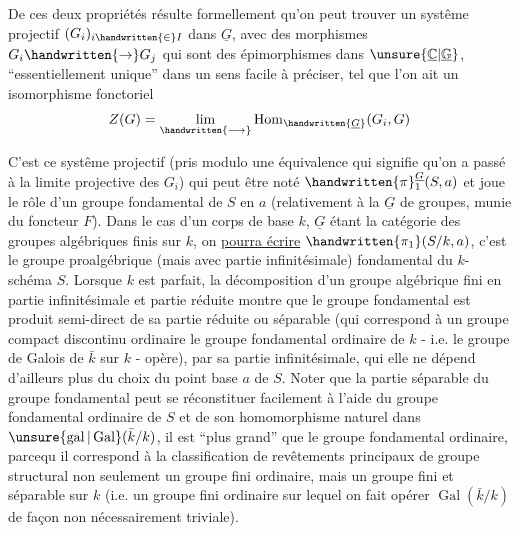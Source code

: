 
De ces deux propriétés résulte formellement qu'on peut trouver un systême projectif  $(G_i)_{i\handwritten{\in}I}$ dans $\underline{G}$, avec des morphismes $G_i\handwritten{\to}G_j$ qui sont des épimorphismes dans $\unsure{\underline{\mathbb{C}}|\underline{\mathbb{G}}}$, ``essentiellement unique'' dans un sens facile à préciser, tel que  l'on ait un isomorphisme fonctoriel
\[
Z(G)=\underset{\handwritten{\longrightarrow}}{\lim}\operatorname{Hom}_{\handwritten{\underline{G}}}(G_i,G)
\]

C'est ce systême projectif (pris modulo une équivalence qui  signifie qu'on a passé à la limite projective des $G_i$) qui peut être noté $\handwritten{\pi}^{\underline{G}}_1(S,a)$ et joue le rôle d'un groupe fondamental de $S$ en $a$ (relativement à la  $\underline{G}$ de groupes, munie du foncteur $F$). Dans le cas  d'un corps de base $k$, $\underline{G}$ étant la catégorie des groupes algébriques finis sur $k$, on \uline{pourra écrire} $\handwritten{\pi_1}(S/k,a)$, c'est le groupe proalgébrique (mais avec partie infinitésimale) fondamental du $k$-schéma $S$. Lorsque $k$ est parfait, la décomposition d'un groupe algébrique fini en partie infinitésimale et partie réduite montre que le groupe fondamental est produit semi-direct de sa partie réduite ou séparable  (qui correspond à un groupe compact discontinu ordinaire\handwritten{,}  le groupe fondamental ordinaire de $k$ - i.e. le groupe de Galois de $\bar{k}$ sur $k$ - opère), par sa partie infinitésimale,  qui elle ne dépend d'ailleurs plus du choix du point base $a$ de $S$. Noter que la partie séparable du groupe fondamental peut se réconstituer facilement à l'aide du groupe fondamental ordinaire de $S$ et de son homomorphisme naturel dans $\unsure{\operatorname{gal}|\operatorname{Gal}}(\bar{k}/k)$,  il est ``plus grand'' que le groupe fondamental ordinaire, parce\inserted{\handwritten{\,}}qu il correspond à la classification de revêtements principaux de groupe structural non seulement un groupe fini ordinaire, mais un groupe  fini et séparable sur $k$ (i.e. un groupe fini ordinaire sur lequel on fait opérer $\operatorname{Gal}(\bar{k}/k)$ de façon non nécessairement triviale). 


